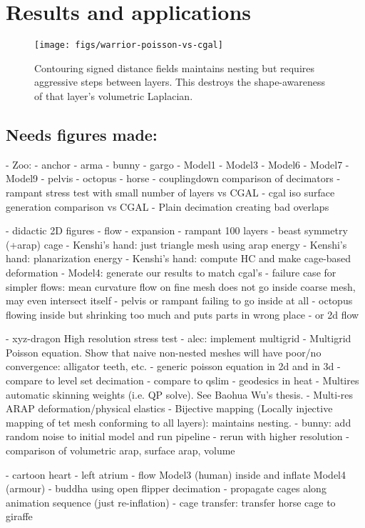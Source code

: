 
\section{Results and applications}
\label{sec:results}



\begin{figure}
\texttt{[image: figs/warrior-poisson-vs-cgal]}
\caption{Contouring signed distance fields maintains nesting but requires
aggressive steps between layers. This destroys the shape-awareness of
that layer's volumetric Laplacian.} 
\label{fig:warrior-poisson}
\end{figure}

\subsection{Needs figures made:}
- Zoo:
  - anchor
  - arma
  - bunny
  - gargo
  - Model1
  - Model3
  - Model6
  - Model7
  - Model9
  - pelvis
  - octopus
  - horse
- couplingdown comparison of decimators
- rampant stress test with small number of layers vs CGAL
- cgal iso surface generation comparison vs CGAL
- Plain decimation creating bad overlaps

- didactic 2D figures
  - flow
  - expansion
- rampant 100 layers
- beast symmetry (+arap) cage
- Kenshi's hand: just triangle mesh using arap energy
- Kenshi's hand: planarization energy 
- Kenshi's hand: compute HC and make cage-based deformation
- Model4: generate our results to match cgal's
- failure case for simpler flows: mean curvature flow on fine mesh does not
  go inside coarse mesh, may even intersect itself
    - pelvis or rampant failing to go inside at all
    - octopus flowing inside but shrinking too much and puts parts in wrong
      place
    - or 2d flow

- xyz-dragon High resolution stress test
- alec: implement multigrid
  - Multigrid Poisson equation. Show that naive non-nested meshes will have
    poor/no convergence: alligator teeth, etc.
      - generic poisson equation in 2d and in 3d
        - compare to level set decimation
        - compare to qslim
      - geodesics in heat 
  - Multires automatic skinning weights (i.e. QP solve). See Baohua Wu's thesis.
  - Multi-res ARAP deformation/physical elastics
  - Bijective mapping (Locally injective mapping of tet mesh conforming to all
    layers): maintains nesting.
- bunny: add random noise to initial model and run pipeline
  - rerun with higher resolution
- comparison of volumetric arap, surface arap, volume

- cartoon heart
- left atrium
- flow Model3 (human) inside and inflate Model4 (armour)
- buddha using open flipper decimation
- propagate cages along animation sequence (just re-inflation)
- cage transfer: transfer horse cage to giraffe

